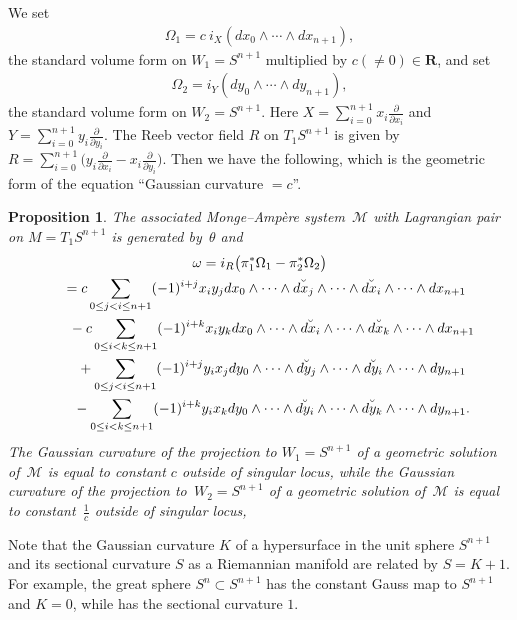 \documentclass[pdftex]{sigma}
\newtheorem{Prop}[Th]{Proposition}
\begin{document}
We set
\begin{gather*}
\Omega_1 =
c\ i_X(dx_0\wedge\cdots\wedge dx_{n+1}),
\end{gather*}
the standard volume form on $W_1=S^{n+1}$ multiplied by $c(\not= 0)\in {\mathbf{R}}$,
and set
\begin{gather*}
\Omega_2 =
i_Y(dy_0\wedge\cdots\wedge dy_{n+1}),
\end{gather*}
the
standard volume form on $W_2=S^{n+1}$.
Here $X = \sum\limits_{i=0}^{n+1} x_i\frac{\partial}{\partial x_i}$ and
$Y = \sum\limits_{i=0}^{n+1} y_i\frac{\partial}{\partial y_i}$.
The Reeb vector f\/ield $R$ on $T_1S^{n+1}$ is given
by
$R = \sum\limits_{i=0}^{n+1} \big(y_i\frac{\partial}{\partial x_i} -
x_i\frac{\partial}{\partial y_i}\big)$.
Then we have the following, which is the geometric form of
the equation ``Gaussian curvature $=c$''.

\begin{Prop}
The associated Monge--Amp{\`e}re system~$\mathcal{M}$
with Lagrangian pair on $M=T_1S^{n+1}$
is generated by~$\theta$ and
\begin{gather*}
\omega    =
i_R \big({\pi}_1^*{\Omega}_1-{\pi}_2^*{\Omega}_2\big)\\
\hphantom{\omega}{}  =
c \sum_{0 \leq j  < i \leq n+1} (-1)^{i+j} x_iy_j
dx_0 \wedge \cdots \wedge \breve{dx_j} \wedge \cdots \wedge
\breve{dx_i}
\wedge \cdots \wedge dx_{n+1}\\
\hphantom{\omega=}{} -  c \sum_{0 \leq i  <  k \leq n+1} (-1)^{i+k} x_iy_k
dx_0 \wedge \cdots \wedge \breve{dx_i} \wedge \cdots \wedge
\breve{dx_k}
\wedge \cdots \wedge dx_{n+1}
\\
\hphantom{\omega=}{} +
\sum_{0 \leq j  < i \leq n+1} (-1)^{i+j} y_ix_j
dy_0 \wedge \cdots \wedge \breve{dy_j} \wedge \cdots \wedge
\breve{dy_i}
\wedge \cdots \wedge dy_{n+1} \\
\hphantom{\omega=}{} -
\sum_{0 \leq i < k \leq n+1} (-1)^{i+k} y_ix_k
dy_0 \wedge \cdots \wedge \breve{dy_i} \wedge \cdots \wedge
\breve{dy_k}
\wedge \cdots \wedge dy_{n+1}.
\end{gather*}
The Gaussian curvature
of the projection to $W_1=S^{n+1}$ of a geometric solution
of~$\mathcal{M}$
is equal to constant $c$ outside of singular locus, while
the Gaussian curvature
of the projection to~$W_2=S^{n+1}$ of a geometric solution
of~$\mathcal{M}$
is equal to constant~$\frac{1}{c}$ outside of singular locus,
\end{Prop}

\begin{Rem}
Note that the Gaussian curvature $K$ of a hypersurface
in the unit sphere $S^{n+1}$ and its sectional curvature $S$
as a Riemannian manifold are related by
$S = K + 1$. For example, the great sphere $S^{n} \subset S^{n+1}$
has the constant Gauss map to $S^{n+1}$ and $K = 0$,
while has the sectional curvature $1$.
\end{Rem}
\end{document}
